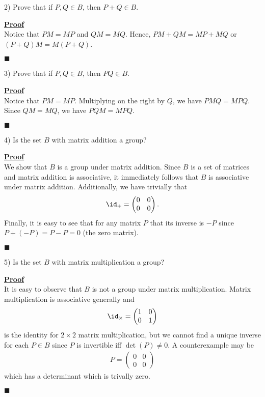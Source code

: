 \documentclass[12pt,a4paper]{article}
\newenvironment{proof}
{
\textbf{\underline{Proof}} \\
}
{
\begin{flushright}
$\blacksquare$
\end{flushright}}
\begin{document}
2) Prove that if $P,Q \in B$, then $P+Q \in B$.

\begin{proof}
Notice that $PM = MP$ and $QM = MQ$. Hence, $PM + QM = MP + MQ$ or $(P+Q)M = M(P+Q)$. 
\end{proof}

3) Prove that if $P,Q \in B$, then $PQ \in B$.

\begin{proof}
Notice that $PM = MP$. Multiplying on the right by $Q$, we have $PMQ = MPQ$. Since $QM = MQ$, we have $PQM = MPQ$.
\end{proof}

4) Is the set $B$ with matrix addition a group?

\begin{proof}
We show that $B$ is a group under matrix addition. Since $B$ is a set of matrices and matrix addition is associative, it immediately follows that $B$ is associative under matrix addition. Additionally, we have trivially that
\begin{align*}
\id_{+} = \begin{pmatrix}
0 & 0 \\
0 & 0
\end{pmatrix}.
\end{align*}
Finally, it is easy to see that for any matrix $P$ that its inverse is $-P$ since $P + (-P) = P - P = 0$ (the zero matrix).
\end{proof}

5) Is the set $B$ with matrix multiplication a group?

\begin{proof}
It is easy to observe that $B$ is not a group under matrix multiplication. Matrix multiplication is associative generally and 
\begin{align*}
\id_{\times} = \begin{pmatrix}
1 & 0 \\
0 & 1
\end{pmatrix}
\end{align*}
is the identity for $2 \times 2$ matrix multiplication, but we cannot find a unique inverse for each $P \in B$ since $P$ is invertible iff $\det(P) \not= 0$. A counterexample may be 
\begin{align*}
P = \begin{pmatrix}
0 & 0 \\
0 & 0
\end{pmatrix}
\end{align*}
which has a determinant which is trivally zero. 
\end{proof}
\end{document}
